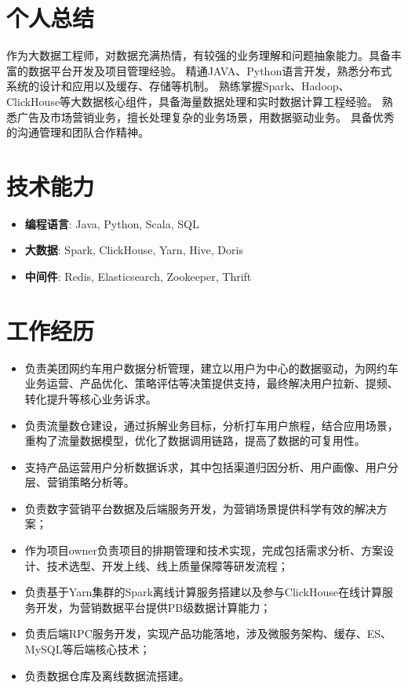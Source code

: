 \documentclass{resume}
\begin{document}

 
\section{个人总结}
作为大数据工程师，对数据充满热情，有较强的业务理解和问题抽象能力。具备丰富的数据平台开发及项目管理经验。
精通JAVA、Python语言开发，熟悉分布式系统的设计和应用以及缓存、存储等机制。
熟练掌握Spark、Hadoop、ClickHouse等大数据核心组件，具备海量数据处理和实时数据计算工程经验。
熟悉广告及市场营销业务，擅长处理复杂的业务场景，用数据驱动业务。
具备优秀的沟通管理和团队合作精神。

\section{技术能力}
\begin{itemize}[parsep=0.2ex]
  \item \textbf{编程语言}: Java, Python, Scala, SQL
  \item \textbf{大数据}: Spark, ClickHouse, Yarn, Hive, Doris
  \item \textbf{中间件}: Redis, Elasticsearch, Zookeeper, Thrift
\end{itemize}

\section{工作经历}
\begin{itemize}
  \item 负责美团网约车用户数据分析管理，建立以用户为中心的数据驱动，为网约车业务运营、产品优化、策略评估等决策提供支持，最终解决用户拉新、提频、转化提升等核心业务诉求。
  \item 负责流量数仓建设，通过拆解业务目标，分析打车用户旅程，结合应用场景，重构了流量数据模型，优化了数据调用链路，提高了数据的可复用性。
  \item 支持产品运营用户分析数据诉求，其中包括渠道归因分析、用户画像、用户分层、营销策略分析等。
\end{itemize}

\begin{itemize}
  \item 负责数字营销平台数据及后端服务开发，为营销场景提供科学有效的解决方案；
  \item 作为项目owner负责项目的排期管理和技术实现，完成包括需求分析、方案设计、技术选型、开发上线、线上质量保障等研发流程；
  \item 负责基于Yarn集群的Spark离线计算服务搭建以及参与ClickHouse在线计算服务开发，为营销数据平台提供PB级数据计算能力；
  \item 负责后端RPC服务开发，实现产品功能落地，涉及微服务架构、缓存、ES、MySQL等后端核心技术；
  \item 负责数据仓库及离线数据流搭建。
\end{itemize}
\end{document}
